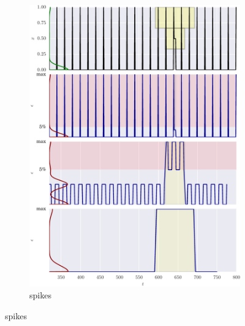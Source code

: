 \begin{figure}[t!] %
    \centering
  
  \begin{subfigure}[t]{\textwidth}
        \centering
        \includegraphics[]{figs/er_spike.pdf}
        \caption{spikes}
    \end{subfigure}%


\end{figure}
